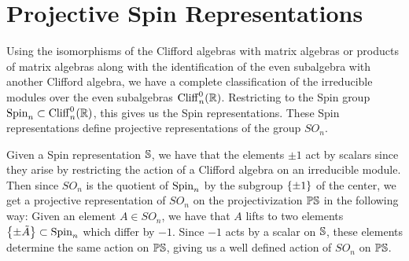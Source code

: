 %
\section{Projective Spin Representations}
%
Using the isomorphisms of the Clifford algebras with matrix algebras
or products of matrix algebras along with the identification of the
even subalgebra with another Clifford algebra, we have a complete classification
of the irreducible modules over the even subalgebras $\Cliff^0_{n}(\R)$.
Restricting to the Spin group $\Spin_n \subset \Cliff^0_n(\R)$, this gives us
the Spin representations. These Spin representations define projective
representations of the group $SO_n$.
%
\iffalse
\begin{prop}
Let $G$ be a group, and $V$ a finite dimensional irreducible representation of $G$.
Then every element of the center acts by scalars, i.e. for $g \in Z(G)$, there
exists a scalar $\lambda_g$ such that for all $v$ in $V$, we have
\[
g \cdot v = \lambda_g v
\]
\end{prop}
%
\begin{proof}
Let $g \in Z(G)$. Then for every $h \in G$ and $v \in V$, we have that
\[
h \cdot (g\cdot v) = g \cdot (h\cdot v)
\]
Therefore, the action of $g$ defines a $G$-equivariant map $V \to V$, which
by Schur's Lemma must necessarily be a scalar multiple of the identity.
\end{proof}
\fi
%
Given a Spin representation $\S$, we have that the elements
$\pm 1$ act by scalars since they arise by restricting the action of a Clifford
algebra on an irreducible module. Then since $SO_n$ is the quotient of $\Spin_n$
by the subgroup $\set{\pm 1}$ of the center, we get a projective representation of
$SO_n$ on the projectivization $\P\S$ in the following way:
Given an element $A \in SO_n$, we have that $A$ lifts to two elements
$\set{\pm \tilde{A}} \subset \Spin_n$ which differ by $-1$. Since $-1$
acts by a scalar on $\S$, these elements determine the same action on
$\P\S$, giving us a well defined action of $SO_n$ on $\P\S$.

